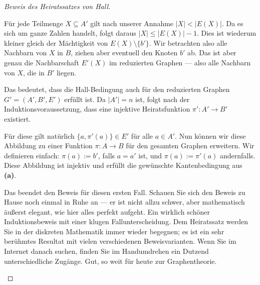 \begin{proof}[Beweis des Heiratssatzes von Hall]
\begin{spoken-clean}[01:22:50 - 01:24:30]
Für jede Teilmenge $X \subseteq A'$ gilt nach unserer Annahme $|X| < |E(X)|$. Da es sich um ganze Zahlen handelt, folgt daraus $|X| \le |E(X)| - 1$. Dies ist wiederum kleiner gleich der Mächtigkeit von $E(X) \setminus \{b'\}$. Wir betrachten also alle Nachbarn von $X$ in $B$, ziehen aber eventuell den Knoten $b'$ ab. Das ist aber genau die Nachbarschaft $E'(X)$ im reduzierten Graphen --- also alle Nachbarn von $X$, die in $B'$ liegen.
\end{spoken-clean}

\begin{spoken-clean}[01:24:30 - 01:26:00]
Das bedeutet, dass die Hall-Bedingung auch für den reduzierten Graphen $G' = (A', B', E')$ erfüllt ist. Da $|A'| = n$ ist, folgt nach der Induktionsvoraussetzung, dass eine injektive Heiratsfunktion $\pi' \colon A' \to B'$ existiert.
\end{spoken-clean}

\begin{spoken-clean}[01:26:00 - 01:27:20]
Für diese gilt natürlich $\{a, \pi'(a)\} \in E'$ für alle $a \in A'$. Nun können wir diese Abbildung zu einer Funktion $\pi \colon A \to B$ für den gesamten Graphen erweitern. Wir definieren einfach: $\pi(a) := b'$, falls $a = a'$ ist, und $\pi(a) := \pi'(a)$ andernfalls. Diese Abbildung ist injektiv und erfüllt die gewünschte Kantenbedingung aus \textbf{(a)}.
\end{spoken-clean}

\begin{ai-global-state-checkpoint-invisible-content}
\end{ai-global-state-checkpoint-invisible-content}

\begin{spoken-clean}[01:27:20 - 01:28:40]
Das beendet den Beweis für diesen ersten Fall. Schauen Sie sich den Beweis zu Hause noch einmal in Ruhe an --- er ist nicht allzu schwer, aber mathematisch äußerst elegant, wie hier alles perfekt aufgeht. Ein wirklich schöner Induktionsbeweis mit einer klugen Fallunterscheidung. Dem Heiratssatz werden Sie in der diskreten Mathematik immer wieder begegnen; es ist ein sehr berühmtes Resultat mit vielen verschiedenen Beweisvarianten. Wenn Sie im Internet danach suchen, finden Sie im Handumdrehen ein Dutzend unterschiedliche Zugänge. Gut, so weit für heute zur Graphentheorie.
\end{spoken-clean}


\end{proof}
